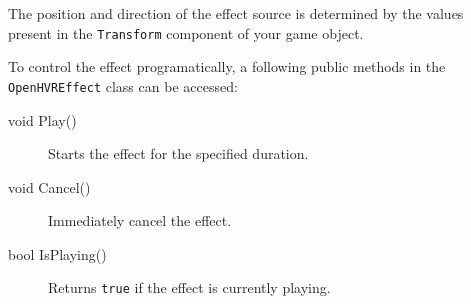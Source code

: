 The position and direction of the effect source is determined by the values
present in the \verb|Transform| component of your game object.

To control the effect programatically, a following public methods in the
\verb|OpenHVREffect| class can be accessed:

\begin{description}
    \item[void Play()] Starts the effect for the specified duration.
    \item[void Cancel()] Immediately cancel the effect.
    \item[bool IsPlaying()] Returns \verb|true| if the effect is currently playing.
\end{description}